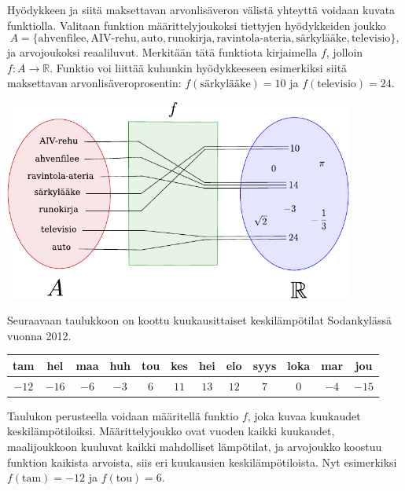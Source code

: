\begin{esimerkki}
	Hyödykkeen ja siitä maksettavan arvonlisäveron välistä yhteyttä voidaan kuvata funktiolla. Valitaan funktion määrittelyjoukoksi tiettyjen hyödykkeiden joukko
		\[ A = \{\text{ahvenfilee}, \text{AIV-rehu}, \text{auto}, \text{runokirja},
		\text{ravintola-ateria}, \text{särkylääke}, \text{televisio}\}, \]
	ja arvojoukoksi reaaliluvut. Merkitään tätä funktiota kirjaimella $f$, jolloin $f\colon A \to \mathbb{R}$. Funktio voi liittää kuhunkin hyödykkeeseen esimerkiksi siitä maksettavan arvonlisäveroprosentin:
	$f(\text{särkylääke}) = 10$ ja $f(\text{televisio}) = 24$.

	\begin{center}
		\includegraphics[width=11.5cm]{pictures/funktiokone.pdf}
	\end{center}
\end{esimerkki}

\begin{esimerkki}
Seuraavaan taulukkoon on koottu kuukausittaiset keskilämpötilat Sodankylässä vuonna 2012.

	\begin{tabular}{|c|c|c|c|c|c|c|c|c|c|c|c|}
	\hline
	tam & hel & maa & huh & tou & kes & hei & elo & syys & loka & mar & jou\\
	\hline
	$-12$ & $-16$ & $-6$ & $-3$ & $6$ & $11$ & $13$ & $12$ & $7$ & $0$ & $-4$ & $-15$\\
	\hline
	\end{tabular}

Taulukon perusteella voidaan määritellä funktio $f$, joka kuvaa kuukaudet keskilämpötiloiksi. Määrittelyjoukko ovat vuoden kaikki kuukaudet, maalijoukkoon kuuluvat kaikki mahdolliset lämpötilat, ja arvojoukko koostuu funktion kaikista arvoista, siis eri kuukausien keskilämpötiloista. Nyt esimerkiksi $f(\text{tam}) = -12$ ja $f(\text{tou}) = 6$.

\end{esimerkki}

